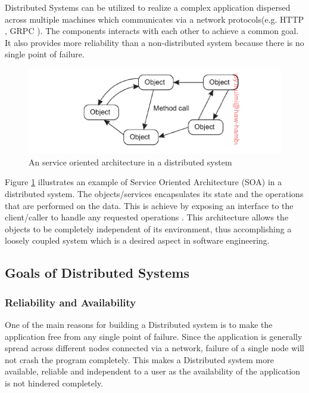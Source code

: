     \par
        Distributed Systems can be utilized to realize a complex application dispersed across
        multiple machines which communicates via a network protocols(e.g. HTTP \cite{HTTP}, 
        GRPC \cite{grpc}). The 
        components interacts with each other to achieve a common goal. It also provides
        more reliability than a non-distributed system because there is no single point
        of failure. 

    \begin{figure}[H]
        \centering \includegraphics[scale=0.9]{grafiken/objectBasedDS.png}
        \caption{An service oriented architecture in a distributed system 
            \cite[p.~62]{DistributedSystems}}
        \label{fig:objectBasedDS}
    \end{figure}

    \par
        Figure \ref{fig:objectBasedDS} illustrates an example of Service Oriented Architecture 
        (SOA) in a distributed system. The objects/services encapsulates its state and 
        the operations that are performed on the data. This is achieve by exposing an 
        interface to the client/caller to handle any requested operations
        \cite{DistributedSystems}. This architecture allows the objects to be
        completely independent of its environment, thus accomplishing a loosely
        coupled system which is a desired aspect in software engineering.
        
    \subsection{Goals of Distributed Systems} 
        \subsubsection{Reliability and Availability}
        One of the main reasons for building a Distributed system is to make the application free from any single point of failure.
        Since the application is generally spread across different nodes connected via a network, failure of a single node will not 
        crash the program completely. This makes a Distributed system more available, reliable and independent to a user as the availability
        of the application is not hindered completely.
        
